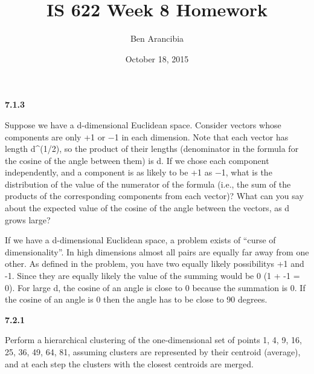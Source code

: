 \documentclass[]{article}
\title{IS 622 Week 8 Homework}
\author{Ben Arancibia}
\date{October 18, 2015}
\newenvironment{Shaded}{\begin{snugshade}}{\end{snugshade}}
\newcommand{\KeywordTok}[1]{\textcolor[rgb]{0.13,0.29,0.53}{\textbf{{#1}}}}
\newcommand{\DecValTok}[1]{\textcolor[rgb]{0.00,0.00,0.81}{{#1}}}
\newcommand{\StringTok}[1]{\textcolor[rgb]{0.31,0.60,0.02}{{#1}}}
\newcommand{\NormalTok}[1]{{#1}}
\begin{document}
\maketitle


\textbf{7.1.3}

Suppose we have a d-dimensional Euclidean space. Consider vectors whose
components are only +1 or −1 in each dimension. Note that each vector
has length d\^{}(1/2), so the product of their lengths (denominator in
the formula for the cosine of the angle between them) is d. If we chose
each component independently, and a component is as likely to be +1 as
−1, what is the distribution of the value of the numerator of the
formula (i.e., the sum of the products of the corresponding components
from each vector)? What can you say about the expected value of the
cosine of the angle between the vectors, as d grows large?

If we have a d-dimensional Euclidean space, a problem exists of ``curse
of dimensionality''. In high dimensions almost all pairs are equally far
away from one other. As defined in the problem, you have two equally
likely possibilitys +1 and -1. Since they are equally likely the value
of the summing would be 0 (1 + -1 = 0). For large d, the cosine of an
angle is close to 0 because the summation is 0. If the cosine of an
angle is 0 then the angle has to be close to 90 degrees.

\textbf{7.2.1}

Perform a hierarchical clustering of the one-dimensional set of points
1, 4, 9, 16, 25, 36, 49, 64, 81, assuming clusters are represented by
their centroid (average), and at each step the clusters with the closest
centroids are merged.

\begin{Shaded}
\end{Shaded}
\end{document}
